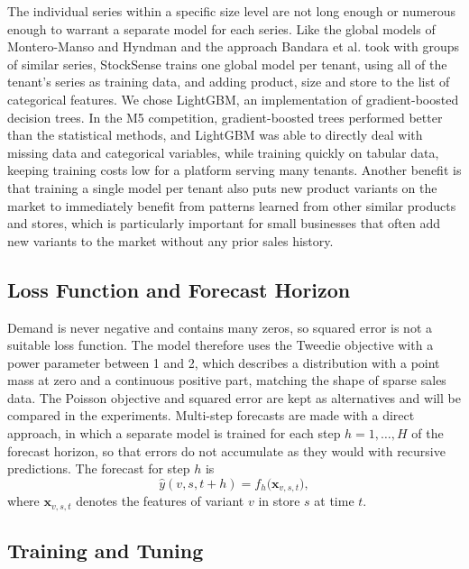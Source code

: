 \documentclass{StockSense}
\begin{document}
The individual series within a specific size level are not long enough or numerous enough to warrant a separate model for each series. Like the global models of Montero-Manso and Hyndman and the approach Bandara et al. took with groups of similar series, StockSense trains one global model per tenant, using all of the tenant's series as training data, and adding product, size and store to the list of categorical features. We chose LightGBM, an implementation of gradient-boosted decision trees. In the M5 competition, gradient-boosted trees performed better than the statistical methods, and LightGBM was able to directly deal with missing data and categorical variables, while training quickly on tabular data, keeping training costs low for a platform serving many tenants. Another benefit is that training a single model per tenant also puts new product variants on the market to immediately benefit from patterns learned from other similar products and stores, which is particularly important for small businesses that often add new variants to the market without any prior sales history.

\subsection{Loss Function and Forecast Horizon}

Demand is never negative and contains many zeros, so squared error is not a suitable loss function. The model therefore uses the Tweedie objective with a power parameter between 1 and 2, which describes a distribution with a point mass at zero and a continuous positive part, matching the shape of sparse sales data. The Poisson objective and squared error are kept as alternatives and will be compared in the experiments. Multi-step forecasts are made with a direct approach, in which a separate model is trained for each step $h = 1,\dots,H$ of the forecast horizon, so that errors do not accumulate as they would with recursive predictions. The forecast for step $h$ is
\begin{equation}
    \hat{y}(v,s,t+h) = f_h\big(\mathbf{x}_{v,s,t}\big),
\end{equation}
where $\mathbf{x}_{v,s,t}$ denotes the features of variant $v$ in store $s$ at time $t$.

\subsection{Training and Tuning}
\end{document}
